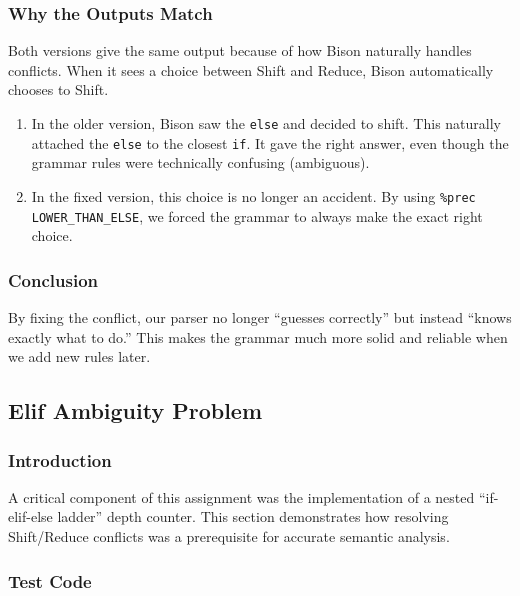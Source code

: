 \documentclass[a4paper,12pt]{article}
\begin{document}
\subsubsection{Why the Outputs Match}

Both versions give the same output because of how Bison naturally handles conflicts. When it sees a choice between Shift and Reduce, Bison automatically chooses to Shift.

\begin{enumerate}
    \item  In the older version, Bison saw the \texttt{else} and decided to shift. This naturally attached the \texttt{else} to the closest \texttt{if}. It gave the right answer, even though the grammar rules were technically confusing (ambiguous).

    \item  In the fixed version, this choice is no longer an accident. By using \texttt{\%prec LOWER\_THAN\_ELSE}, we forced the grammar to always make the exact right choice.
\end{enumerate}

\subsubsection{Conclusion}

By fixing the conflict, our parser no longer ``guesses correctly'' but instead ``knows exactly what to do.'' This makes the grammar much more solid and reliable when we add new rules later.



\subsection{Elif Ambiguity Problem}
\label{sec:elif_ambiguity_analysis}

\subsubsection{Introduction}

A critical component of this assignment was the implementation of a nested ``if-elif-else ladder'' depth counter. This section demonstrates how resolving Shift/Reduce conflicts was a prerequisite for accurate semantic analysis.

\subsubsection{Test Code}
\end{document}
